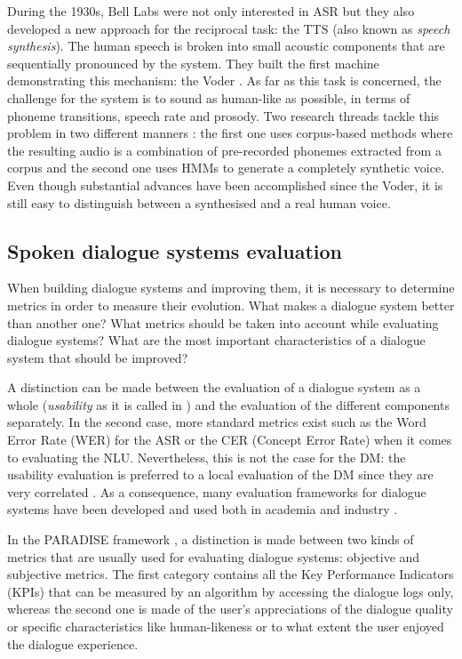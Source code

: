                         During the 1930s, Bell Labs were not only interested in ASR but they also developed a new approach for the reciprocal task: the TTS (also known as \textit{speech synthesis}). The human speech is broken into small acoustic components that are sequentially pronounced by the system. They built the first machine demonstrating this mechanism: the Voder \cite{Dudley1939}. As far as this task is concerned, the challenge for the system is to sound as human-like as possible, in terms of phoneme transitions, speech rate and prosody. Two research threads tackle this problem in two different manners \cite{Tabet2011}: the first one uses corpus-based methods where the resulting audio is a combination of pre-recorded phonemes extracted from a corpus and the second one uses HMMs to generate a completely synthetic voice. Even though substantial advances have been accomplished since the Voder, it is still easy to distinguish between a synthesised and a real human voice.

                        \subsection{Spoken dialogue systems evaluation}

                        When building dialogue systems and improving them, it is necessary to determine metrics in order to measure their evolution. What makes a dialogue system better than another one? What metrics should be taken into account while evaluating dialogue systems? What are the most important characteristics of a dialogue system that should be improved?
                        
                        A distinction can be made between the evaluation of a dialogue system as a whole (\textit{usability} as it is called in \cite{Moller2007}) and the evaluation of the different components separately. In the second case, more standard metrics exist such as the Word Error Rate (WER) for the ASR or the CER (Concept Error Rate) when it comes to evaluating the NLU. Nevertheless, this is not the case for the DM: the usability evaluation is preferred to a local evaluation of the DM since they are very correlated \cite{Dybkjaer2004}. As a consequence, many evaluation frameworks for dialogue systems have been developed and used both in academia \cite{Walker1997,Hone2000,Schmitt2012} and industry \cite{Evanini2008,Witt2011}.

                        In the PARADISE framework \cite{Walker1997}, a distinction is made between two kinds of metrics that are usually used for evaluating dialogue systems: objective and subjective metrics. The first category contains all the Key Performance Indicators (KPIs) that can be measured by an algorithm by accessing the dialogue logs only, whereas the second one is made of the user's appreciations of the dialogue quality or specific characteristics like human-likeness or to what extent the user enjoyed the dialogue experience.


